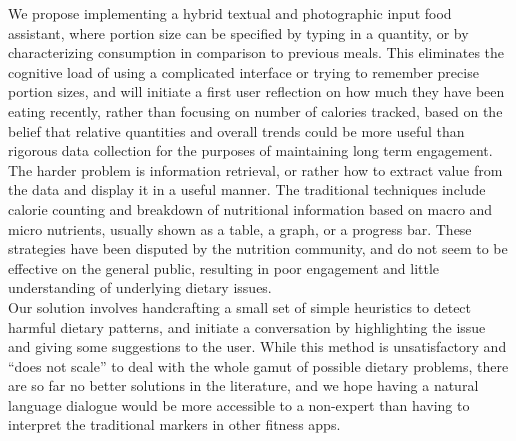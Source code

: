We propose implementing a hybrid textual and photographic input food assistant, where portion size can be specified by typing in a quantity, or by characterizing consumption in comparison to previous meals. This eliminates the cognitive load of using a complicated interface or trying to remember precise portion sizes, and will initiate a first user reflection on how much they have been eating recently, rather than focusing on number of calories tracked, based on the belief that relative quantities and overall trends could be more useful than rigorous data collection for the purposes of maintaining long term engagement. \\
The harder problem is information retrieval, or rather how to extract value from the data and display it in a useful manner. The traditional techniques include calorie counting and breakdown of nutritional information based on macro and micro nutrients, usually shown as a table, a graph, or a progress bar. These strategies have been disputed by the nutrition community, and do not seem to be effective on the general public, resulting in poor engagement and little understanding of underlying dietary issues. \\
Our solution involves handcrafting a small set of simple heuristics to detect harmful dietary patterns, and initiate a conversation by highlighting the issue and giving some suggestions to the user. While this method is unsatisfactory and ``does not scale'' to deal with the whole gamut of possible dietary problems, there are so far no better solutions in the literature, and we hope having a natural language dialogue would be more accessible to a non-expert than having to interpret the traditional markers in other fitness apps. \\

